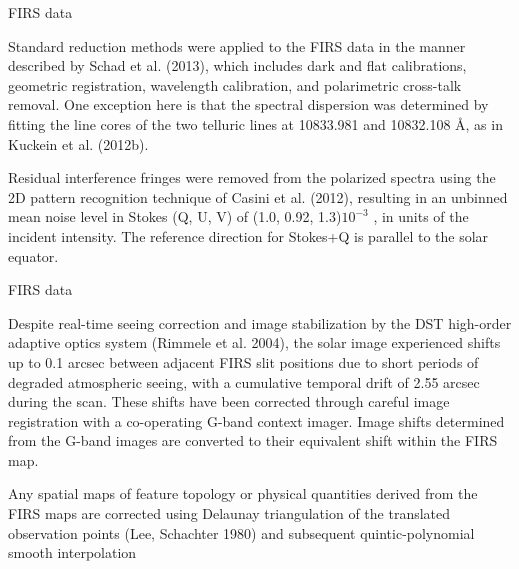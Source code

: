 \documentclass{beamer}
\begin{document}
\begin{frame}{FIRS data}

Standard reduction methods were applied to the FIRS data in
the manner described by Schad et al. (2013), which includes
dark and flat calibrations, geometric registration, wavelength
calibration, and polarimetric cross-talk removal. One exception
here is that the spectral dispersion was determined by fitting the
line cores of the two telluric lines at 10833.981 and
10832.108 \AA , as in Kuckein et al. (2012b). 

Residual interference fringes were removed from the polarized spectra using
the 2D pattern recognition technique of Casini et al. (2012),
resulting in an unbinned mean noise level in Stokes (Q, U, V)
of (1.0, 0.92, 1.3)$10^{-3}$ , in units of the incident intensity.
The reference direction for Stokes+Q is parallel to the solar
equator.

\end{frame}

\begin{frame}{FIRS data}

Despite real-time seeing correction and image stabilization
by the DST high-order adaptive optics system (Rimmele
et al. 2004), the solar image experienced shifts up to 0.1 arcsec
between adjacent FIRS slit positions due to short periods of
degraded atmospheric seeing, with a cumulative temporal drift
of 2.55 arcsec during the scan. These shifts have been corrected
through careful image registration with a co-operating G-band
context imager. Image shifts determined from the G-band
images are converted to their equivalent shift within the FIRS
map. 

Any spatial maps of feature topology or physical
quantities derived from the FIRS maps are corrected using
Delaunay triangulation of the translated observation points
(Lee, Schachter 1980) and subsequent quintic-polynomial
smooth interpolation

\end{frame}
\end{document}
